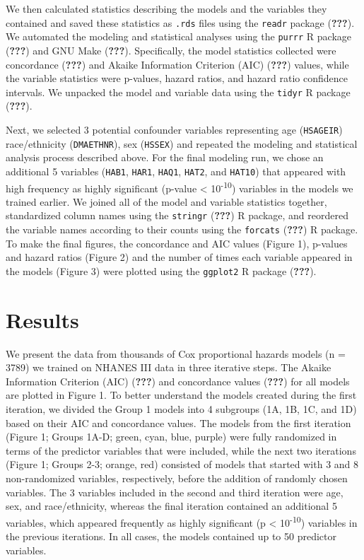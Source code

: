 \documentclass[12pt,twoside]{reedthesis}
\theoremstyle{definition}
\theoremstyle{definition}
\theoremstyle{definition}
\theoremstyle{remark}
\begin{document}
We then calculated statistics describing the models and the variables
they contained and saved these statistics as \texttt{.rds} files using
the \texttt{readr} package ({\textbf{???}}). We automated the modeling
and statistical analyses using the \texttt{purrr} R package
({\textbf{???}}) and GNU Make ({\textbf{???}}). Specifically, the model
statistics collected were concordance ({\textbf{???}}) and Akaike
Information Criterion (AIC) ({\textbf{???}}) values, while the variable
statistics were p-values, hazard ratios, and hazard ratio confidence
intervals. We unpacked the model and variable data using the
\texttt{tidyr} R package ({\textbf{???}}).

Next, we selected 3 potential confounder variables representing age
(\texttt{HSAGEIR}) race/ethnicity (\texttt{DMAETHNR}), sex
(\texttt{HSSEX}) and repeated the modeling and statistical analysis
process described above. For the final modeling run, we chose an
additional 5 variables (\texttt{HAB1}, \texttt{HAR1}, \texttt{HAQ1},
\texttt{HAT2}, and \texttt{HAT10}) that appeared with high frequency as
highly significant (p-value \textless{} 10\textsuperscript{-10})
variables in the models we trained earlier. We joined all of the model
and variable statistics together, standardized column names using the
\texttt{stringr} ({\textbf{???}}) R package, and reordered the variable
names according to their counts using the \texttt{forcats}
({\textbf{???}}) R package. To make the final figures, the concordance
and AIC values (Figure 1), p-values and hazard ratios (Figure 2) and the
number of times each variable appeared in the models (Figure 3) were
plotted using the \texttt{ggplot2} R package ({\textbf{???}}).

\hypertarget{results}{%
\section{Results}\label{results}}

We present the data from thousands of Cox proportional hazards models (n
= 3789) we trained on NHANES III data in three iterative steps. The
Akaike Information Criterion (AIC) ({\textbf{???}}) and concordance
values ({\textbf{???}}) for all models are plotted in Figure 1. To
better understand the models created during the first iteration, we
divided the Group 1 models into 4 subgroups (1A, 1B, 1C, and 1D) based
on their AIC and concordance values. The models from the first iteration
(Figure 1; Groups 1A-D; green, cyan, blue, purple) were fully randomized
in terms of the predictor variables that were included, while the next
two iterations (Figure 1; Groups 2-3; orange, red) consisted of models
that started with 3 and 8 non-randomized variables, respectively, before
the addition of randomly chosen variables. The 3 variables included in
the second and third iteration were age, sex, and race/ethnicity,
whereas the final iteration contained an additional 5 variables, which
appeared frequently as highly significant (p \textless{}
10\textsuperscript{-10}) variables in the previous iterations. In all
cases, the models contained up to 50 predictor variables.
\end{document}
